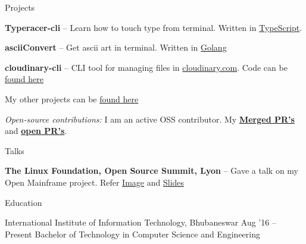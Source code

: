 \documentclass{resume} %
\begin{document}

\begin{rSection}{Projects}
  \begin{rProjectSection}
    \item \textbf {Typeracer-cli} -- Learn how to touch type from terminal. Written in \href{https://github.com/p-society/typeracer-cli/}{TypeScript}.
    \item \textbf {asciiConvert} -- Get ascii art in terminal. Written in \href{https://github.com/knrt10/asciiConvert/}{Golang}
    \item \textbf {cloudinary-cli} -- CLI tool for managing files in \href{https://cloudinary.com/}{cloudinary.com}. Code can be \href{https://github.com/knrt10/cloudinary-cli/}{found here}
    \item My other projects can be \href{https://knrt10.github.io/projects/}{found here}
  \end{rProjectSection}

  \begin{rBlurbSection}
    \item {\em Open-source contributions:}
      I am an active OSS contributor. My \href{http://bit.ly/2kdr9Ui}{\textbf{Merged PR's}} and \href{http://bit.ly/2kxjvV9}{\textbf{open PR's}}.
  \end{rBlurbSection}
\end{rSection}


\begin{rSection}{Talks}
  \begin{rProjectSection}
    \item \textbf {The Linux Foundation, Open Source Summit, Lyon} -- Gave a talk on my Open Mainframe project. Refer \href{https://user-images.githubusercontent.com/24803604/68012174-99a5a680-fc89-11e9-8c8e-800e68b8c231.jpeg}{Image} and \href{https://drive.google.com/file/d/1z2dhNwudUs8BYJRzIXL70UH7htLJasf0/view}{Slides}
  \end{rProjectSection}
\end{rSection}


\begin{rSection}{Education}
  \begin{rEducationSection}{International Institute of Information Technology, Bhubaneswar}
                           {Aug '16 -- Present}
                           {Bachelor of Technology in Computer Science and Engineering}
  \end{rEducationSection}
\end{rSection}
\end{document}
